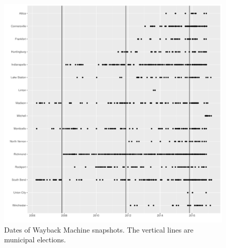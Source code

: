 \documentclass[11pt]{article}
\begin{document}

\begin{figure}[!ht]
	\centering
	\caption{Dates of Wayback Machine snapshots. The vertical lines are municipal elections.}
	\label{snapshots}
	\includegraphics[width=\linewidth]{figures/Snapshots.pdf}
\end{figure}
\end{document}

